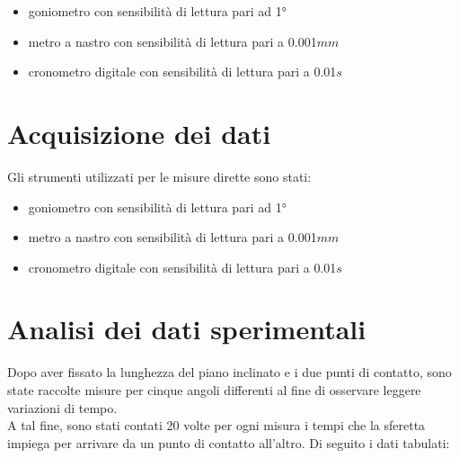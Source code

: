 \documentclass[a4paper, 12pt]{article} %
\begin{document}
 \begin{itemize}
 	\item goniometro con sensibilità di lettura pari ad 1°
 \end{itemize}
\begin{itemize}
	\item metro a nastro con sensibilità di lettura pari a 0.001$mm$
\end{itemize}
\begin{itemize}
	\item cronometro digitale con sensibilità di lettura pari a 0.01$s$
\end{itemize}



\section{Acquisizione dei dati}
Gli strumenti utilizzati per le misure dirette sono stati:
\begin{itemize}
	\item goniometro con sensibilità di lettura pari ad 1°
\end{itemize}
\begin{itemize}
\item metro a nastro con sensibilità di lettura pari a 0.001$mm$
\end{itemize}
\begin{itemize}
\item cronometro digitale con sensibilità di lettura pari a 0.01$s$\bigskip
\end{itemize}

\section{Analisi dei dati sperimentali}

Dopo aver fissato la lunghezza del piano inclinato e i due punti di contatto, sono state raccolte misure per cinque angoli differenti al fine di osservare leggere variazioni di tempo.\\
A tal fine, sono stati contati 20 volte per ogni misura i tempi che la sferetta impiega per arrivare da un punto di contatto all'altro.\vfill
Di seguito i dati tabulati:
\end{document}
